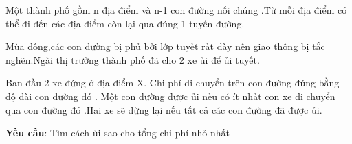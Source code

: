 Một thành phố gồm n địa điểm và n-1 con đường nối chúng .Từ mỗi địa điểm có thể đi đến các địa điểm còn lại qua đúng 1 tuyến đường.


Mùa đông,các con đường bị phủ bởi lớp tuyết rất dày nên giao thông bị tắc nghẽn.Ngài thị trưởng thành phố đã cho 2 xe ủi để ủi tuyết.


Ban đầu 2 xe đứng ở địa điểm X. Chi phí di chuyển trên con đường đúng bằng độ dài con đường đó . Một con đường được ủi nếu có ít nhất con xe di chuyển qua con đường đó .Hai xe sẽ dừng lại nếu tất cả các con đường đã được ủi.




\textbf{Yều cầu}: Tìm cách ủi sao cho tổng chi phí nhỏ nhất